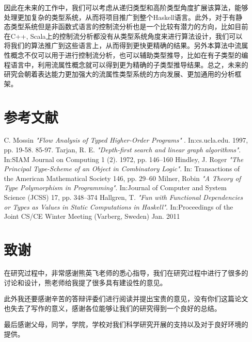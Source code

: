 \documentclass[12pt, titlepage]{article}
\begin{document}
	因此在未来的工作中，我们可以考虑从递归类型和高阶类型角度扩展该算法，能够处理更加复杂的类型系统，从而将项目推广到整个Haskell语言。此外，对于有静态类型系统但是非函数式语言的控制流分析也是一个比较有潜力的方向，比如目前在C++, Scala上的控制流分析都没有从类型系统角度来进行算法设计，我们可以将我们的算法推广到这些语言上，从而得到更快更精确的结果。另外本算法中流属性概念不仅可以用于进行控制流分析，也可以辅助类型推导，比如在有子类型的编程语言中，利用流属性概念就可以得到更为精确的子类型推导结果。总之，未来的研究会朝着表达能力更加强大的流属性类型系统的方向发展、更加通用的分析框架。
	\newpage
	\section{参考文献}
	\begin{thebibliography}{1}
		 C. Mossin {\em "Flow Analysis of Typed Higher-Order Programs"} . In:cs.ucla.edu. 1997, pp. 19-58. 85-97.
		 Tarjan, R. E. {\em  "Depth-first search and linear graph algorithms"}. In:SIAM Journal on Computing 1 (2). 1972, pp. 146–160
		 Hindley, J. Roger {\em "The Principal Type-Scheme of an Object in Combinatory Logic"}. In: Transactions of the American Mathematical Society 146, pp. 29–60
		 Milner, Robin {\em "A Theory of Type Polymorphism in Programming"}. In:Journal of Computer and System Science (JCSS) 17, pp. 348–374
		 Hallgren, T.  {\em "Fun with Functional Dependencies or Types as Values in Static Computations in Haskell"}. In:Proceedings of the Joint CS/CE Winter Meeting (Varberg, Sweden) Jan. 2011
	\end{thebibliography}
	\newpage
	\section{致谢}
	在研究过程中，非常感谢熊英飞老师的悉心指导，我们在研究过程中进行了很多的讨论和设计，熊老师给我提了很多具有建设性的意见。
	
	此外我还要感谢辛苦的答辩评委们进行阅读并提出宝贵的意见，没有你们这篇论文也失去了写作的意义，感谢各位能够让我们的研究得到一个良好的总结。
	
	最后感谢父母，同学，学院，学校对我们科学研究开展的支持以及对于良好环境的提供。
\end{document}
